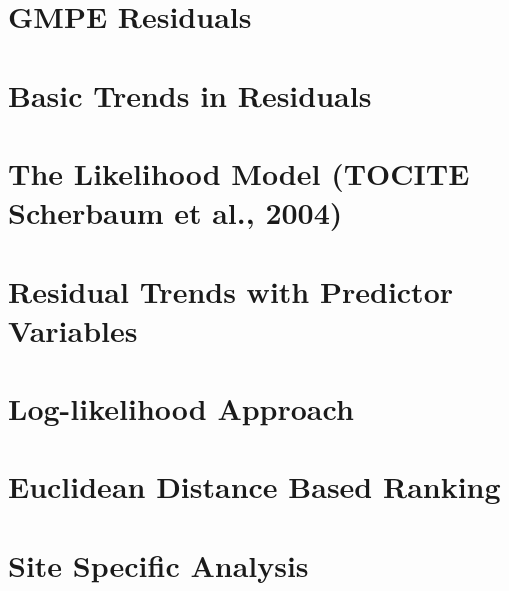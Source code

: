 \section{GMPE Residuals}
\label{sec:residuals}


\section{Basic Trends in Residuals}
\label{sec:residual_trends}

\section{The Likelihood Model (TOCITE Scherbaum et al., 2004)}
\label{sec:lh_model}

\section{Residual Trends with Predictor Variables}
\label{sec:predictor_trends}

\section{Log-likelihood Approach}
\label{sec:llh}

\section{Euclidean Distance Based Ranking}
\label{sec:edr}

\section{Site Specific Analysis}
\label{sec:site}